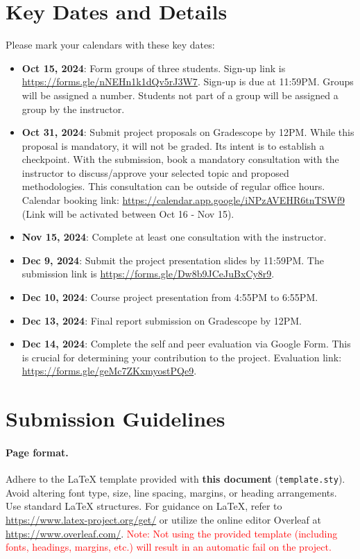 \documentclass{article}
\begin{document}
\section{Key Dates and Details}
Please mark your calendars with these key dates:
\begin{itemize}
  \item \textbf{Oct 15, 2024}: Form groups of three students. Sign-up link is \url{https://forms.gle/nNEHn1k1dQv5rJ3W7}. Sign-up is due at 11:59PM. Groups will be assigned a number. Students not part of a group will be assigned a group by the instructor.
  \item \textbf{Oct 31, 2024}: Submit project proposals on Gradescope by 12PM. While this proposal is mandatory, it will not be graded. Its intent is to establish a checkpoint. With the submission, book a mandatory consultation with the instructor to discuss/approve your selected topic and proposed methodologies. This consultation can be outside of regular office hours. Calendar booking link: \url{https://calendar.app.google/iNPzAVEHR6tnTSWf9} (Link will be activated between Oct 16 - Nov 15).
  \item \textbf{Nov 15, 2024}: Complete at least one consultation with the instructor.
  \item \textbf{Dec 9, 2024}: Submit the project presentation slides by 11:59PM. The submission link is \url{https://forms.gle/Dw8b9JCeJuBxCy8r9}.
  \item \textbf{Dec 10, 2024}: Course project presentation from 4:55PM to 6:55PM.
  \item \textbf{Dec 13, 2024}: Final report submission on Gradescope by 12PM.
  \item \textbf{Dec 14, 2024}: Complete the self and peer evaluation via Google Form. This is crucial for determining your contribution to the project. Evaluation link: \url{https://forms.gle/geMc7ZKxmyostPQe9}.
\end{itemize}

\section{Submission Guidelines}
\paragraph{Page format.} Adhere to the LaTeX template provided with \textbf{this document} (\texttt{template.sty}). Avoid altering font type, size, line spacing, margins, or heading arrangements. Use standard LaTeX structures. For guidance on LaTeX, refer to \url{https://www.latex-project.org/get/} or utilize the online editor Overleaf at \url{https://www.overleaf.com/}. \textcolor{red}{Note: Not using the provided template (including fonts, headings, margins, etc.) will result in an automatic fail on the project.}
\end{document}
